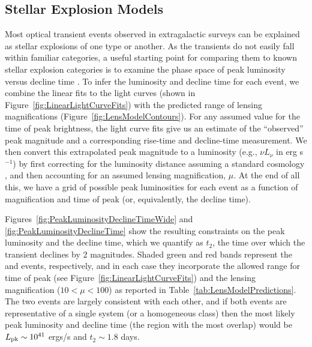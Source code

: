 \subsection{Stellar Explosion Models}
\label{sec:Classification}

Most optical transient events observed in extragalactic surveys can be
explained as stellar explosions of one type or another.  As the \spock
transients do not easily fall within familiar categories, a useful
starting point for comparing them to known stellar explosion
categories is to examine the phase space of peak luminosity versus
decline time \citep[see, e.g.,][]{Kasliwal:2010}.  To infer the
luminosity and decline time for each \spock event, we combine the
linear fits to the light curves (shown in
Figure~\ref{fig:LinearLightCurveFits}) with the predicted range of
lensing magnifications (Figure~\ref{fig:LensModelContours}). For any
assumed value for the time of peak brightness, the light curve fits
give us an estimate of the ``observed'' peak magnitude and a
corresponding rise-time and decline-time measurement.  We then convert
this extrapolated peak magnitude to a luminosity (e.g., $\nu L_\nu$ in
erg s$^{-1}$) by first correcting for the luminosity distance assuming
a standard \LCDM cosmology \citep{Planck:2016}, and then accounting
for an assumed lensing magnification, $\mu$.  At the end of all this,
we have a grid of possible peak luminosities for each event as a
function of magnification and time of peak (or, equivalently, the
decline time).

Figures~\ref{fig:PeakLuminosityDeclineTimeWide} and
\ref{fig:PeakLuminosityDeclineTime} show the resulting
constraints on the peak luminosity and the decline time, which we
quantify as $t_2$, the time over which the transient declines by 2
magnitudes.  Shaded green and red bands represent the \spockone and
\spocktwo events, respectively, and in each case they incorporate the
allowed range for time of peak (see
Figure~\ref{fig:LinearLightCurveFits}) and the lensing magnification
($10<\mu<100$) as reported in Table~\ref{tab:LensModelPredictions}.
The two events are largely consistent with each other, and if both
events are representative of a single system (or a homogeneous class)
then the most likely peak luminosity and decline time (the region with
the most overlap) would be $L_{\rm pk}\sim10^{41}$ ergs/s and
$t_2\sim1.8$ days.


